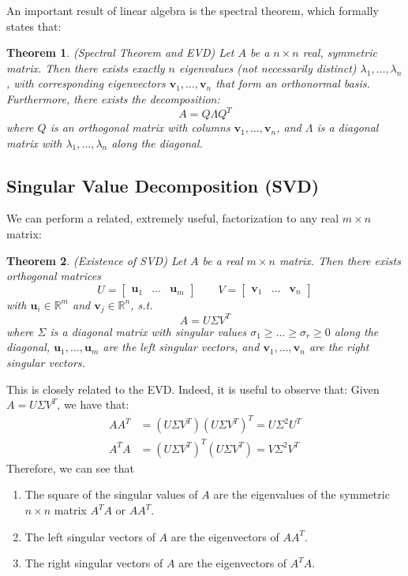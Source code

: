 \documentclass[11pt]{article}
\newtheorem{theorem}{Theorem}[section]
\begin{document}
\begin{multicols}{2}
An important result of linear algebra is the spectral theorem, which formally states that:
\begin{theorem}
\emph{(Spectral Theorem and EVD)}
\label{EVD}
Let $A$ be a $n \times n$ real, symmetric matrix. Then there exists exactly $n$ eigenvalues (not necessarily distinct) $\lambda_1, \ldots, \lambda_n$, with corresponding eigenvectors $\mathbf{v}_1, \ldots, \mathbf{v}_n$ that form an orthonormal basis. Furthermore, there exists the decomposition:
\[A = Q \Lambda Q^T\]
where $Q$ is an orthogonal matrix with columns $\mathbf{v}_1, \ldots, \mathbf{v}_n$, and $\Lambda$ is a diagonal matrix with $\lambda_1, \ldots, \lambda_n$ along the diagonal.
\end{theorem}

\subsection*{Singular Value Decomposition (SVD)}

We can perform a related, extremely useful, factorization to any real $m \times n$ matrix:
\begin{theorem}
\emph{(Existence of SVD)}
\label{SVD}
Let $A$ be a real $m \times n$ matrix. Then there exists orthogonal matrices
\[U =\begin{bmatrix} \mathbf{u}_1& \ldots & \mathbf{u}_m \end{bmatrix} \qquad V =\begin{bmatrix} \mathbf{v}_1& \ldots & \mathbf{v}_n \end{bmatrix}\]
with $\mathbf{u}_i \in \mathbb{R}^m$ and $\mathbf{v}_j \in \mathbb{R}^n$, s.t.
\[A = U \Sigma V^T\]
where $\Sigma$ is a diagonal matrix with singular values $\sigma_1 \ge \ldots \ge \sigma_r \ge 0$ along the diagonal, $\mathbf{u}_1, \ldots, \mathbf{u}_m$ are the left singular vectors, and $\mathbf{v}_1, \ldots, \mathbf{v}_n$ are the right singular vectors.
\end{theorem}

This is closely related to the EVD. Indeed, it is useful to observe that:
Given $A = U\Sigma V^T$, we have that:
\begin{align*}
AA^T &= (U \Sigma V^T) (U \Sigma V^T)^T = U \Sigma^2 U^T\\
A^TA &= (U \Sigma V^T)^T (U \Sigma V^T) = V \Sigma^2 V^T
\end{align*}
Therefore, we can see that
\begin{enumerate}
\item The square of the singular values of $A$ are the eigenvalues of the symmetric $n \times n$ matrix $A^TA$ or $AA^T$.
\item The left singular vectors of $A$ are the eigenvectors of $AA^T$.
\item The right singular vectors of $A$ are the eigenvectors of $A^TA$.
\end{enumerate}


\end{multicols}
\end{document}
